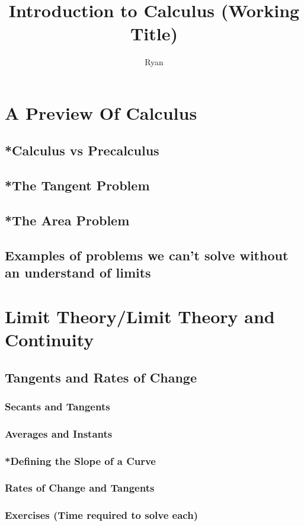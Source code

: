 \documentclass[11pt,letterpaper,twoside]{book}
\author{Ryan}
\title{Introduction to Calculus (Working Title)}
\begin{document}
\maketitle
\tableofcontents

\mainmatter
\chapter{A Preview Of Calculus}
\section{*Calculus vs Precalculus}
\section{*The Tangent Problem}
\section{*The Area Problem}
\section{Examples of problems we can't solve without an understand of limits}

\newpage
\chapter{Limit Theory/Limit Theory and Continuity}
\section{Tangents and Rates of Change}
\subsection{Secants and Tangents}
\subsection{Averages and Instants}
\subsection{*Defining the Slope of a Curve}
\subsection{Rates of Change and Tangents}
\subsection{Exercises (Time required to solve each)}
\end{document}
